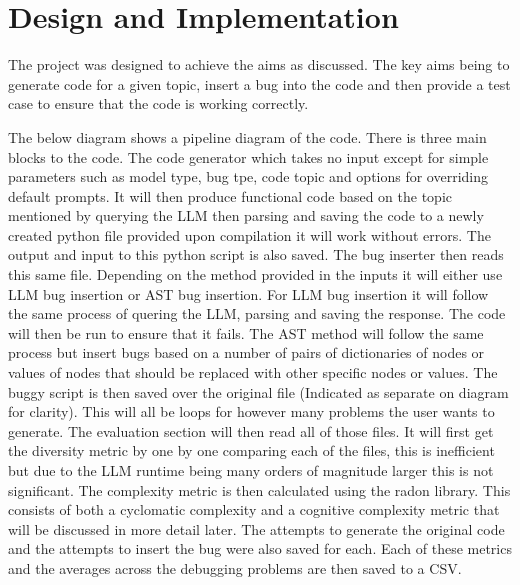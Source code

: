 \documentclass[12pt]{extarticle}
\begin{document}
\newpage
\section{Design and Implementation}

The project was designed to achieve the aims as discussed. The key aims being to generate code for a given topic, insert a bug into the code and then provide a test case to ensure that the code is working correctly. 

The below diagram shows a pipeline diagram of the code. There is three main blocks to the code. The code generator which takes no input except for simple parameters such as model type, bug tpe, code topic and options for overriding default prompts. It will then produce functional code based on the topic mentioned by querying the LLM then parsing and saving the code to a newly created python file provided upon compilation it will work without errors. The output and input to this python script is also saved. The bug inserter then reads this same file. Depending on the method provided in the inputs it will either use LLM bug insertion or AST bug insertion. For LLM bug insertion it will follow the same process of quering the LLM, parsing and saving the response. The code will then be run to ensure that it fails. The AST method will follow the same process but insert bugs based on a number of pairs of dictionaries of nodes or values of nodes that should be replaced with other specific nodes or values. The buggy script is then saved over the original file (Indicated as separate on diagram for clarity). This will all be loops for however many problems the user wants to generate. The evaluation section will then read all of those files. It will first get the diversity metric by one by one comparing each of the files, this is inefficient but due to the LLM runtime being many orders of magnitude larger this is not significant. The complexity metric is then calculated using the radon library. This consists of both a cyclomatic complexity and a cognitive complexity metric that will be discussed in more detail later. The attempts to generate the original code and the attempts to insert the bug were also saved for each. Each of these metrics and the averages across the debugging problems are then saved to a CSV.
\end{document}
